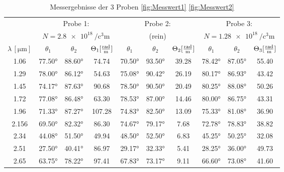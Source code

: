 \begin{table}[H]
	\centering
	\caption{Messergebnisse der 3 Proben \eqref{fig:Messwert1} \eqref{fig:Messwert2}}
	\begin{tabular}{|c|c c c|c c c|c c c|}
		\toprule
		& \multicolumn{3}{|c|}{Probe 1:}  & \multicolumn{3}{|c|}{Probe 2:}  & \multicolumn{3}{|c|}{Probe 3:}   \\
        & \multicolumn{3}{|c|}{$N=\qty[per-mode=fraction]{2.8e18}{\per\cubic\centi\meter} $}  
        & \multicolumn{3}{|c|}{(rein)}  & \multicolumn{3}{|c|}{$N=\qty[per-mode=fraction]{1.28e18}{\per\cubic\centi\meter} $}   \\
        \midrule
        $\lambda \, [\unit{\micro\meter}] $ & $\theta_1$ & $\theta_2 $ &$\Theta_1 [\unit[per-mode=fraction]{\radian\per\meter}]$  
        & $\theta_1 $ & $ \theta_2 $ &$\Theta_2 [\unit[per-mode=fraction]{\radian\per\meter}]$ 
        & $\theta_1 $ & $ \theta_2 $ &$\Theta_3 [\unit[per-mode=fraction]{\radian\per\meter}]$\\
		\midrule
            \num{1.06} & \num{77.50}° & \num{88.60}° & \num{74.74} & \num{70.50}° & \num{93.50}° & \num{39.28} & \num{78.42}° & \num{87.05}° & \num{55.40} \\
            \num{1.29} & \num{78.00}° & \num{86.12}° & \num{54.63} & \num{75.08}° & \num{90.42}° & \num{26.19} & \num{80.17}° & \num{86.93}° & \num{43.42} \\
            \num{1.45} & \num{74.17}° & \num{87.63}° & \num{90.68} & \num{78.50}° & \num{90.50}° & \num{20.49} & \num{80.25}° & \num{88.08}° & \num{50.26} \\
            \num{1.72} & \num{77.08}° & \num{86.48}° & \num{63.30} & \num{78.53}° & \num{87.00}° & \num{14.46} & \num{80.00}° & \num{86.75}° & \num{43.31} \\
            \num{1.96} & \num{71.33}° & \num{87.27}° & \num{107.28}& \num{74.83}° & \num{82.50}° & \num{13.09} & \num{75.33}° & \num{81.08}° & \num{36.90} \\
            \num{2.156}& \num{69.50}° & \num{82.32}° & \num{86.30} & \num{74.67}° & \num{79.17}° & \num{7.68}  & \num{72.78}° & \num{78.83}° & \num{38.82} \\
            \num{2.34} & \num{44.08}° & \num{51.50}° & \num{49.94} & \num{48.50}° & \num{52.50}° & \num{6.83}  & \num{45.25}° & \num{50.25}° & \num{32.08} \\
            \num{2.51} & \num{27.50}° & \num{40.41}° & \num{86.97} & \num{29.17}° & \num{32.33}° & \num{5.41}  & \num{28.25}° & \num{36.00}° & \num{49.73} \\
            \num{2.65} & \num{63.75}° & \num{78.22}° & \num{97.41} & \num{67.83}° & \num{73.17}° & \num{9.11}  & \num{66.60}° & \num{73.08}° & \num{41.60} \\
		\bottomrule
	\end{tabular}
	\label{tab:data}
\end{table}

